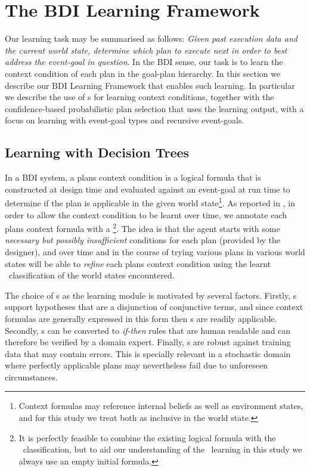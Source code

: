 \section{The BDI Learning Framework}\label{sec:framework}

Our learning task may be summarised as follows: \textit{Given past execution data and the current world state, determine which plan to execute next in order to best address the event-goal in question}. In the BDI sense, our task is to learn the context condition of each plan in the goal-plan hierarchy. In this section we describe our BDI Learning Framework that enables such learning. In particular we describe the use of \dt s for learning context conditions, together with the confidence-based probabilistic plan selection that uses the learning output, with a focus on learning with event-goal types and recursive event-goals.

\subsection{Learning with Decision Trees}

In a BDI system, a plans context condition is a logical formula that is constructed at design time and evaluated against an event-goal at run time to determine if the plan is applicable in the given world state\footnote{Context formulas may reference internal beliefs as well as environment states, and for this study we treat both as inclusive in the world state.}. As reported in \cite{Airiau:IJAT:09}, in order to allow the context condition to be learnt over time, we annotate each plans context formula with a \textit{\dt}\footnote{It is perfectly feasible to combine the existing logical formula with the \dt\ classification, but to aid our understanding of the \dt\ learning in this study we always use an empty initial formula.}. The idea is that the agent starts with some \textit{necessary but possibly insufficient} conditions for each plan (provided by the designer), and over time and in the course of trying various plans in various world states will be able to \textit{refine} each plans context condition using the learnt \dt\ classification of the world states encountered.

The choice of \dt s as the learning module is motivated by several factors. Firstly, \dt s support hypotheses that are a disjunction of conjunctive terms, and since context formulas are generally expressed in this form then \dt s are readily applicable. Secondly, \dt s can be converted to \textit{if-then} rules that are human readable and can therefore be verified by a domain expert. Finally, \dt s are robust against training data that may contain errors. This is specially relevant in a stochastic domain where perfectly applicable plans may nevertheless fail due to unforeseen circumstances.

